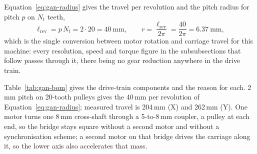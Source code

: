 Equation~\ref{eq:gan-radius} gives the travel per revolution and the pitch radius for pitch $p$ on $N_t$ teeth,
\begin{equation}
\ell_{\mathrm{rev}}=p\,N_t=2\cdot20=40\ \mathrm{mm},\qquad r=\frac{\ell_{\mathrm{rev}}}{2\pi}=\frac{40}{2\pi}=6.37\ \mathrm{mm},
\label{eq:gan-radius}
\end{equation}
which is the single conversion between motor rotation and carriage travel for this machine: every resolution, speed and torque figure in the subsubsections that follow passes through it, there being no gear reduction anywhere in the drive train.

Table~\ref{tab:gan-bom} gives the drive-train components and the reason for each. 2\,mm pitch on 20-tooth pulleys gives the 40\,mm per revolution of Equation~\ref{eq:gan-radius}; measured travel is 204\,mm (X) and 262\,mm (Y). One motor turns one 8\,mm cross-shaft through a 5-to-8\,mm coupler, a pulley at each end, so the bridge stays square without a second motor and without a synchronisation scheme; a second motor on that bridge drives the carriage along it, so the lower axis also accelerates that mass.

